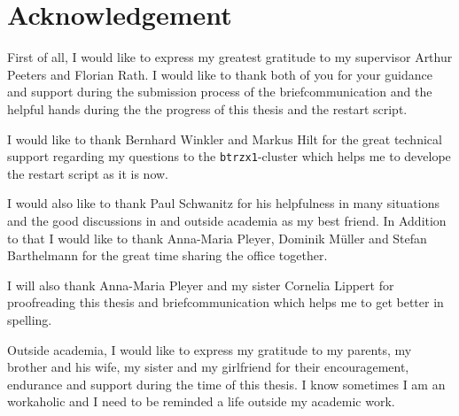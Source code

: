 \chapter*{Acknowledgement}
\label{chap:acknowledgement}

First of all, I would like to express my greatest gratitude to my supervisor Arthur Peeters and Florian Rath. I would like to thank both of you for your guidance and support during the submission process of the briefcommunication and the helpful hands during the the progress of this thesis and the restart script. \bigskip

I would like to thank Bernhard Winkler and Markus Hilt for the great technical support regarding my questions to the \texttt{btrzx1}-cluster which helps me to develope the restart script as it is now. \bigskip

I would also like to thank Paul Schwanitz for his helpfulness in many situations and the good discussions in and outside academia as my best friend. In Addition to that I would like to thank Anna-Maria Pleyer, Dominik Müller and Stefan Barthelmann for the great time sharing the office together. \bigskip

I will also thank Anna-Maria Pleyer and my sister Cornelia Lippert for proofreading this thesis and briefcommunication which helps me to get better in spelling. \bigskip

Outside academia, I would like to express my gratitude to my parents, my brother and his wife, my sister and my girlfriend for their encouragement, endurance and support during the time of this thesis. I know sometimes I am an workaholic and I need to be reminded a life outside my academic work.